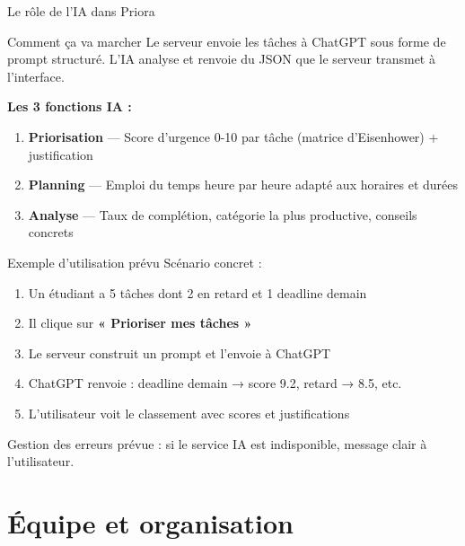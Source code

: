 \documentclass[aspectratio=169, 10pt]{beamer}
\begin{document}
\begin{frame}{Le rôle de l'IA dans Priora}
\begin{block}{Comment ça va marcher}
\small Le serveur envoie les tâches à ChatGPT sous forme de prompt structuré. L'IA analyse et renvoie du JSON que le serveur transmet à l'interface.
\end{block}
\vspace{0.3cm}
\textbf{\textcolor{secondary}{Les 3 fonctions IA :}}
\begin{enumerate}\small
    \item \textbf{Priorisation} — Score d'urgence 0-10 par tâche (matrice d'Eisenhower) + justification
    \item \textbf{Planning} — Emploi du temps heure par heure adapté aux horaires et durées
    \item \textbf{Analyse} — Taux de complétion, catégorie la plus productive, conseils concrets
\end{enumerate}
\end{frame}

\begin{frame}{Exemple d'utilisation prévu}
\small Scénario concret :
\vspace{0.2cm}
\begin{enumerate}\small
    \item Un étudiant a 5 tâches dont 2 en retard et 1 deadline demain
    \item Il clique sur \textbf{« Prioriser mes tâches »}
    \item Le serveur construit un prompt et l'envoie à ChatGPT
    \item ChatGPT renvoie : deadline demain → score 9.2, retard → 8.5, etc.
    \item L'utilisateur voit le classement avec scores et justifications
\end{enumerate}
\vspace{0.3cm}
\small\textcolor{muted}{Gestion des erreurs prévue : si le service IA est indisponible, message clair à l'utilisateur.}
\end{frame}

\section{Équipe et organisation}
\end{document}
